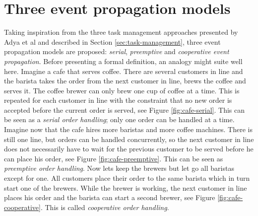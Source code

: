 \section{Three event propagation models}

Taking inspiration from the three task management approaches presented by Adya
et al \cite{adya2002cooperative} and described in Section
\ref{sec:task-management}, three event propagation models are proposed:
\textit{serial}, \textit{preemptive} and \textit{cooperative event
propagation}. Before presenting a formal definition, an analogy might suite
well here. Imagine a cafe that serves coffee. There are several customers in
line and the barista takes the order from the next customer in line, brews the
coffee and serves it. The coffee brewer can only brew one cup of coffee at a
time. This is repeated for each customer in line with the constraint that no
new order is accepted before the current order is served, see Figure
\ref{fig:cafe-serial}. This can be seen as a \textit{serial order handling};
only one order can be handled at a time. Imagine now that the cafe hires more
baristas and more coffee machines. There is still one line, but orders can be
handled concurrently, so the next customer in line does not necessarily have to
wait for the previous customer to be served before he can place his order, see
Figure \ref{fig:cafe-preemptive}. This can be seen as \textit{preemptive order
handling}. Now lets keep the brewers but let go all baristas except for one.
All customers place their order to the same barista which in turn start one of
the brewers. While the brewer is working, the next customer in line places his
order and the barista can start a second brewer, see Figure
\ref{fig:cafe-cooperative}. This is called \textit{cooperative order handling}.

